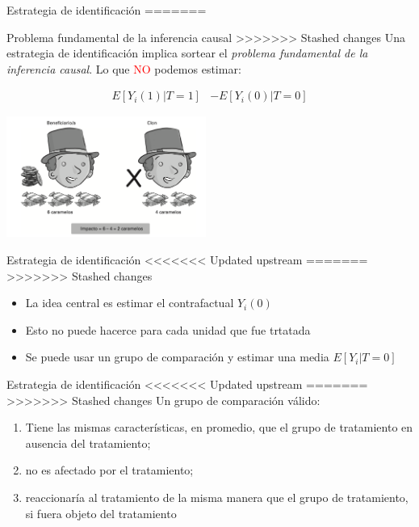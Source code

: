 \documentclass[
  ignorenonframetext,
]{beamer}
\providecommand{\tightlist}{%
  \setlength{\itemsep}{0pt}\setlength{\parskip}{0pt}}
\begin{document}
\begin{frame}{Estrategia de identificación}
\protect\hypertarget{estrategia-de-identificaciuxf3n}{}
=======
\begin{frame}{Problema fundamental de la inferencia causal}
\protect\hypertarget{problema-fundamental-de-la-inferencia-causal-2}{}
>>>>>>> Stashed changes
Una estrategia de identificación implica sortear el \emph{problema
fundamental de la inferencia causal}. Lo que \textcolor{red}{NO} podemos
estimar:

\[
\begin{aligned}
E[Y_{i}(1) | T = 1] & - E[Y_{i}(0) | T = 0]
\end{aligned}
\] \pause

\center

\includegraphics[width=0.49\textwidth,height=\textheight]{figs/clon_contrafactual}
\end{frame}

\begin{frame}{Estrategia de identificación}
<<<<<<< Updated upstream
\protect\hypertarget{estrategia-de-identificaciuxf3n-1}{}
=======
\protect\hypertarget{estrategia-de-identificaciuxf3n}{}
>>>>>>> Stashed changes
\begin{itemize}
\tightlist
\item
  La idea central es estimar el contrafactual \(Y_{i}(0)\) \pause
\item
  Esto no puede hacerce para cada unidad que fue trtatada \pause
\item
  Se puede usar un grupo de comparación y estimar una media
  \(E[Y_{i} | T = 0]\)
\end{itemize}
\end{frame}

\begin{frame}{Estrategia de identificación}
<<<<<<< Updated upstream
\protect\hypertarget{estrategia-de-identificaciuxf3n-2}{}
=======
\protect\hypertarget{estrategia-de-identificaciuxf3n-1}{}
>>>>>>> Stashed changes
Un grupo de comparación válido:

\begin{enumerate}
[(1)]
\tightlist
\item
  Tiene las mismas características, en promedio, que el grupo de
  tratamiento en ausencia del tratamiento; \pause
\item
  no es afectado por el tratamiento; \pause
\item
  reaccionaría al tratamiento de la misma manera que el grupo de
  tratamiento, si fuera objeto del tratamiento \pause
\end{enumerate}


\end{frame}
\end{frame}
\end{document}
